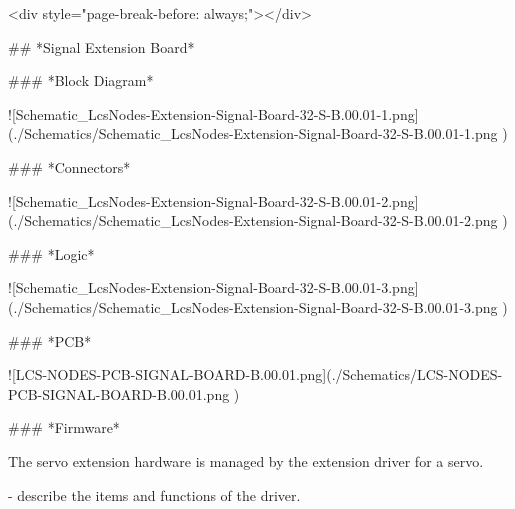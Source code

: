 <div style="page-break-before: always;"></div>

## *Signal Extension Board*

### *Block Diagram*

![Schematic_LcsNodes-Extension-Signal-Board-32-S-B.00.01-1.png](./Schematics/Schematic_LcsNodes-Extension-Signal-Board-32-S-B.00.01-1.png )

### *Connectors*

![Schematic_LcsNodes-Extension-Signal-Board-32-S-B.00.01-2.png](./Schematics/Schematic_LcsNodes-Extension-Signal-Board-32-S-B.00.01-2.png )

### *Logic*

![Schematic_LcsNodes-Extension-Signal-Board-32-S-B.00.01-3.png](./Schematics/Schematic_LcsNodes-Extension-Signal-Board-32-S-B.00.01-3.png )

### *PCB*

![LCS-NODES-PCB-SIGNAL-BOARD-B.00.01.png](./Schematics/LCS-NODES-PCB-SIGNAL-BOARD-B.00.01.png )

### *Firmware*

The servo extension hardware is managed by the extension driver for a servo.

- describe the items and functions of the driver.